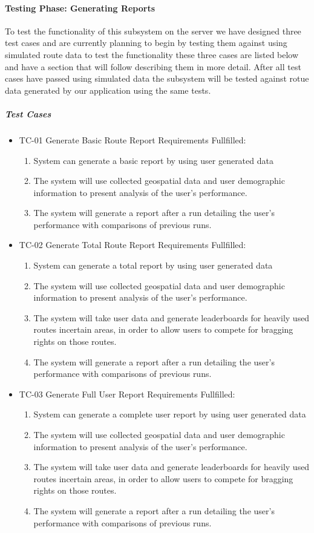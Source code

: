 \documentclass{article}
\begin{document}
\paragraph{Testing Phase: Generating Reports}
To test the functionality of this subsystem on the server we have designed three test cases and are currently planning to begin by testing them against using simulated route data to test the functionality these three cases are listed below and have a section that will follow describing them in more detail. After all test cases have passed using simulated data the subsystem will be tested against rotue data generated by our application using the same tests.

\subparagraph{Test Cases}
\begin{itemize}
\item TC-01 Generate Basic Route Report
  \subitem Requirements Fullfilled:
  \begin{enumerate}
    \item System can generate a basic report by using user generated data
    \item The system will use collected geospatial data and user demographic information to present analysis of the user’s performance.
    \item The system will generate a report after a run detailing the user’s performance with comparisons of previous runs.
  \end{enumerate}
\item TC-02 Generate Total Route Report
  \subitem Requirements Fullfilled:
  \begin{enumerate}
    \item System can generate a total report by using user generated data
    \item The system will use collected geospatial data and user demographic information to present analysis of the user’s performance.
    \item The system will take user data and generate leaderboards for heavily used routes incertain areas, in order to allow users to compete for bragging rights on those routes.
    \item The system will generate a report after a run detailing the user’s performance with comparisons of previous runs.
  \end{enumerate}
\item TC-03 Generate Full User Report
  \subitem Requirements Fullfilled:
  \begin{enumerate}
    \item System can generate a complete user report by using user generated data
    \item The system will use collected geospatial data and user demographic information to present analysis of the user’s performance.
    \item The system will take user data and generate leaderboards for heavily used routes incertain areas, in order to allow users to compete for bragging rights on those routes.
    \item The system will generate a report after a run detailing the user’s performance with comparisons of previous runs.
  \end{enumerate}
\end{itemize}
\end{document}

